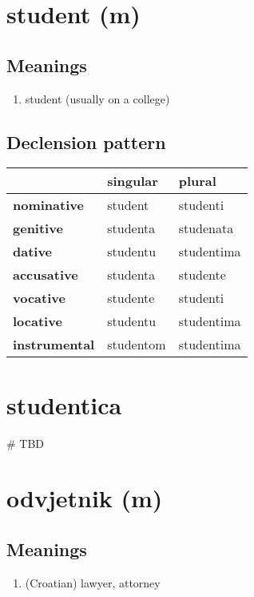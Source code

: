 \filbreak
\section{student (m)}
\subsection*{Meanings}
\begin{enumerate}
\item student (usually on a college)
\end{enumerate}
\subsection*{Declension pattern}
\begin{tabularx}{\linewidth}{Xll}
\toprule
{} &   singular &      plural \\
\midrule
\textbf{nominative  } &    student &    studenti \\
\textbf{genitive    } &   studenta &   studenata \\
\textbf{dative      } &   studentu &  studentima \\
\textbf{accusative  } &   studenta &    studente \\
\textbf{vocative    } &   studente &    studenti \\
\textbf{locative    } &   studentu &  studentima \\
\textbf{instrumental} &  studentom &  studentima \\
\bottomrule
\end{tabularx}

\filbreak
\section{studentica}
{\# TBD}
\section{odvjetnik (m)}
\subsection*{Meanings}
\begin{enumerate}
\item (Croatian) lawyer, attorney
\end{enumerate}

